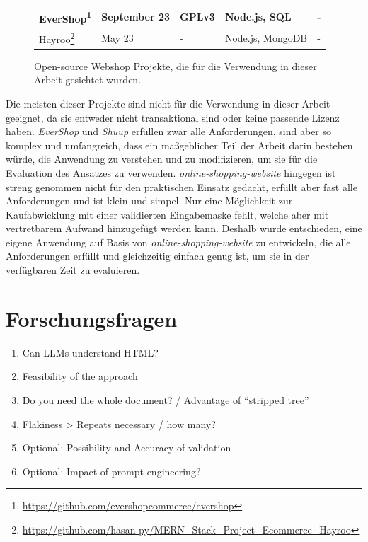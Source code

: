 \begin{figure}[h]
\begin{minipage}[c]{\textwidth}
{\begin{tabular}{ | l | l | l | l | l |}
                EverShop\footnote{\url{https://github.com/evershopcommerce/evershop}} & September 23 & GPLv3 & Node.js, SQL & - \\ \hline
                Hayroo\footnote{\url{https://github.com/hasan-py/MERN_Stack_Project_Ecommerce_Hayroo}} & May 23 & - & Node.js, MongoDB & - \\ \hline
            \end{tabular}
        }
    \end{minipage}
    \caption{Open-source Webshop Projekte, die für die Verwendung in dieser Arbeit gesichtet wurden.}
    \label{tab:webshop_projects}
\end{figure}

Die meisten dieser Projekte sind nicht für die Verwendung in dieser Arbeit geeignet, da sie entweder nicht transaktional sind oder keine passende Lizenz haben.
\textit{EverShop} und \textit{Shuup} erfüllen zwar alle Anforderungen, sind aber so komplex und umfangreich, dass ein maßgeblicher Teil der Arbeit darin bestehen würde, die Anwendung zu verstehen und zu modifizieren, um sie für die Evaluation des Ansatzes zu verwenden.
\textit{online-shopping-website} hingegen ist streng genommen nicht für den praktischen Einsatz gedacht, erfüllt aber fast alle Anforderungen und ist klein und simpel.
Nur eine Möglichkeit zur Kaufabwicklung mit einer validierten Eingabemaske fehlt, welche aber mit vertretbarem Aufwand hinzugefügt werden kann.
Deshalb wurde entschieden, eine eigene Anwendung auf Basis von \textit{online-shopping-website} zu entwickeln, die alle Anforderungen erfüllt und gleichzeitig einfach genug ist, um sie in der verfügbaren Zeit zu evaluieren.

\section{Forschungsfragen}

\begin{enumerate}
    \item Can LLMs understand HTML?
    \item Feasibility of the approach
    \item Do you need the whole document? / Advantage of “stripped tree”
    \item Flakiness > Repeats necessary / how many?
    \item Optional: Possibility and Accuracy of validation
    \item Optional: Impact of prompt engineering?
\end{enumerate}


